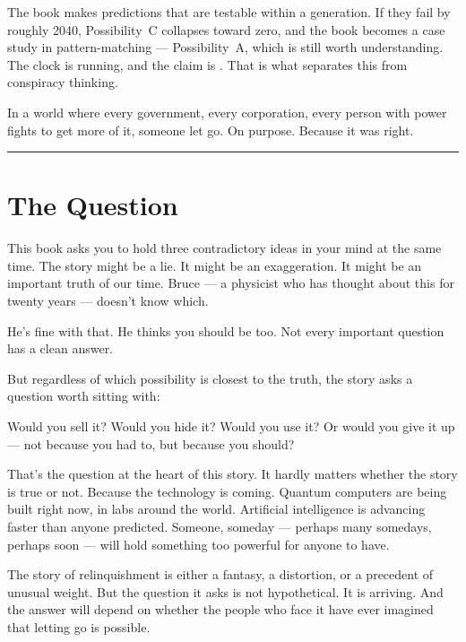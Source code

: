 The book makes predictions that are testable within a generation. If they fail by roughly 2040, Possibility~C collapses toward zero, and the book becomes a case study in pattern-matching --- Possibility~A, which is still worth understanding. The clock is running, and the claim is . That is what separates this from conspiracy thinking.

In a world where every government, every corporation, every person with power fights to get more of it, someone let go. On purpose. Because it was right.

\vspace{1cm}\noindent\rule{0.5\textwidth}{0.5pt}\vspace{0.5cm}


\section*{The Question}
\label{front:the-question}

This book asks you to hold three contradictory ideas in your mind at the same time. The story might be a lie. It might be an exaggeration. It might be an important truth of our time. Bruce --- a physicist who has thought about this for twenty years --- doesn't know which.

He's fine with that. He thinks you should be too. Not every important question has a clean answer.

But regardless of which possibility is closest to the truth, the story asks a question worth sitting with:

Would you sell it? Would you hide it? Would you use it? Or would you give it up --- not because you had to, but because you should?

That's the question at the heart of this story. It hardly matters whether the story is true or not. Because the technology is coming. Quantum computers are being built right now, in labs around the world. Artificial intelligence is advancing faster than anyone predicted. Someone, someday --- perhaps many somedays, perhaps soon --- will hold something too powerful for anyone to have.

The story of relinquishment is either a fantasy, a distortion, or a precedent of unusual weight. But the question it asks is not hypothetical. It is arriving. And the answer will depend on whether the people who face it have ever imagined that letting go is possible.

